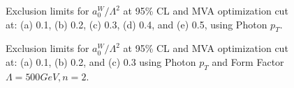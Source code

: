 \begin{figure}[hb]
\begin{center}
{  }
    \caption{ Exclusion limits for $a_{0}^{W}/\Lambda^{2}$ at 95\% CL and MVA optimization cut at: (a) 0.1, (b) 0.2, (c) 0.3, (d) 0.4, and (e) 0.5, using Photon $p_{T}$.}
    \label{fig:limits_MVA}
  \end{center}
\end{figure}

\begin{figure}[hb]
  \begin{center}
    \caption{ Exclusion limits for $a_{0}^{W}/\Lambda^{2}$ at 95\% CL and MVA optimization cut at: (a) 0.1, (b) 0.2, and (c) 0.3 using Photon $p_{T}$ and Form Factor $\Lambda = 500 GeV, n = 2$.}
    \label{fig:limits_MVA_FF}
  \end{center}
\end{figure}


